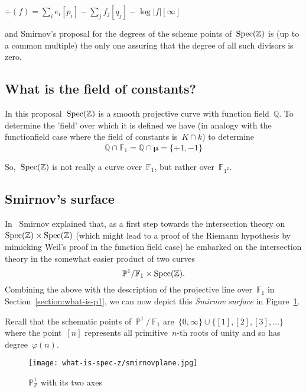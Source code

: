 $\div(f) = \sum_i e_i [p_i] - \sum_j f_j [q_j] - \log |f| [\infty]$

and Smirnov's proposal for the degrees of the scheme points of~$\operatorname{Spec}(\mathbb{Z})$ is (up to a common multiple) the only one assuring that the degree of all such divisors is zero.

\subsection{What is the field of constants?}

In this proposal~$\operatorname{Spec}(\mathbb{Z})$ is a smooth projective curve with function field~$\mathbb{Q}$. To determine the 'field' over which it is defined we have (in analogy with the functionfield case where the field of constants is~$K \cap \overline{k}$) to determine
\begin{equation}
  \mathbb{Q} \cap \overline{\mathbb{F}_1} = \mathbb{Q} \cap \pmb{\mu} = \{ +1,-1 \}
\end{equation}

So,~$\operatorname{Spec}(\mathbb{Z})$ is not really a curve over~$\mathbb{F}_1$, but rather over~$\mathbb{F}_{1^2}$.

\subsection{Smirnov's surface}

In~\cite{letters-to-manin} Smirnov explained that, as a first step towards the intersection theory on~$\operatorname{Spec}(\mathbb{Z}) \times \operatorname{Spec}(\mathbb{Z})$ (which might lead to a proof of the Riemann hypothesis by mimicking Weil's proof in the function field case) he embarked on the intersection theory in the somewhat easier product of two curves
\begin{equation}
  \mathbb{P}^1/\mathbb{F}_1\times\operatorname{Spec}(\mathbb{Z}).
\end{equation}
Combining the above with the description of the projective line over~$\mathbb{F}_1$ in Section~\ref{section:what-is-p1}, we can now depict this \emph{Smirnov surface} in Figure~\ref{figure:smirnov-spec-z-axes}.

Recall that the schematic points of~$\mathbb{P}^1~/~\mathbb{F}_1$ are~$\{ 0,\infty \} \cup \{  [1],[2],[3],\ldots \}$ where the point~$[n]$ represents all primitive~$n$-th roots of unity and so has degree~$\varphi(n)$.

\begin{figure}[ht]
  \centering
  \texttt{[image: what-is-spec-z/smirnovplane.jpg]}
  \caption{$\mathbb{P}^1_{\mathbb{Z}}$ with its two axes}
  \label{figure:smirnov-spec-z-axes}
\end{figure}


